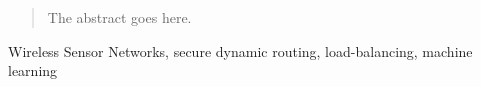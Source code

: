 \documentclass[journal]{IEEEtran}
\begin{document}







\maketitle


\begin{abstract}
The abstract goes here.
\end{abstract}

\begin{IEEEkeywords}
Wireless Sensor Networks, secure dynamic routing, load-balancing, machine learning 
\end{IEEEkeywords}






%
\IEEEpeerreviewmaketitle
\end{document}
